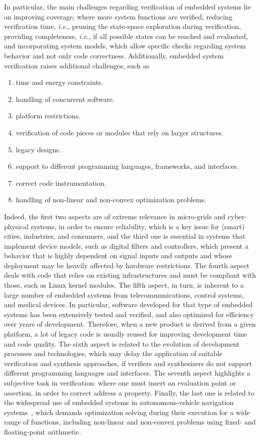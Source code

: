 \documentclass{acm_sen_article}
\begin{document}
In particular, the main challenges regarding verification of embedded systems lie on improving coverage, where more system functions are verified, reducing verification time, {\it i.e.}, pruning the state-space exploration during verification, providing completeness, {\it i.e.},  if all possible states can be reached and evaluated, and incorporating system models, which allow specific checks regarding system behavior and not only code correctness. Additionally, embedded system verification raises additional challenges, such as 
%
\begin{enumerate}
	\item time and energy constraints.
	\item handling of concurrent software.
	\item platform restrictions.
	\item verification of code pieces or modules that rely on larger structures.
	\item legacy designs. %
	\item support to different programming languages, frameworks, and interfaces.
	\item correct code instrumentation.
	\item handling of non-linear and non-convex optimization problems.
\end{enumerate}

Indeed, the first two aspects are of extreme relevance in micro-grids and cyber-physical systems, in order to ensure reliability, which is a key issue for (smart) cities, industries, and consumers, and the third one is essential in systems that implement device models, such as digital filters and controllers, which present a behavior that is highly dependent on signal inputs and outputs and whose deployment may be heavily affected by hardware restrictions. The fourth aspect deals with code that relies on existing infrastructures and must be compliant with those, such as Linux kernel modules. The fifth aspect, in turn, is inherent to a large number of embedded systems from  telecommunications, control systems, and medical devices. In particular, software developed for that type of embedded systems has been extensively tested and verified, and also optimized for efficiency over years of development. Therefore, when a new product is derived from a given platform, a lot of legacy code is usually reused for improving development time and code quality. The sixth aspect is related to the evolution of development processes and technologies, which may delay the application of suitable verification and synthesis approaches, if verifiers and synthesizers do not support different programming languages and interfaces. The seventh aspect highlights a subjective task in verification: where one must insert an evaluation point or assertion, in order to correct address a property. Finally, the last one is related to the widespread use of embedded systems in autonomous-vehicle navigation systems~\cite{Adouane16}, which demands optimization solving during their execution for a wide range of functions, including non-linear and non-convex problems using fixed- and floating-point arithmetic.
\end{document}
